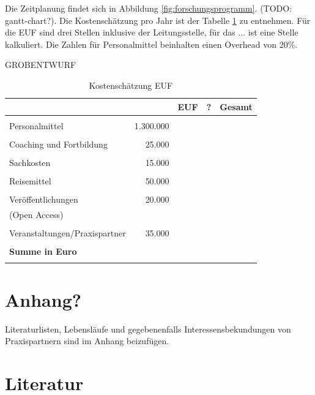 \documentclass[a4paper,11pt,twoside]{scrartcl}
\begin{document}
Die Zeitplanung findet sich in Abbildung \ref{fig:forschungsprogramm}. (TODO: gantt-chart?). Die Kostenschätzung pro Jahr ist der Tabelle \ref{tab:kostenkalkulation} zu entnehmen. Für die EUF sind drei Stellen inklusive der Leitungsstelle, für das ... ist eine Stelle kalkuliert. Die Zahlen für Personalmittel beinhalten einen Overhead von 20\%.

GROBENTWURF
\begin{table}[h]
\begin{center}
  \caption{Kostenschätzung EUF}
\begin{tabular}[h]{lrrrr}
&& EUF & ? & Gesamt\\
\hline
\hline
&&&&\\
 Personalmittel & 1.300.000 & & &\\
 \hline
 &&&&\\
 Coaching und Fortbildung & 25.000& & &\\
 \hline
 &&&&\\
 Sachkosten & 15.000& & &\\
 \hline
 &&&&\\
 Reisemittel & 50.000 & & &\\
 \hline
 &&&&\\
 Veröffentlichungen & 20.000 &&&\\
 (Open Access) && & &\\
 \hline
 &&&&\\
Veranstaltungen/Praxispartner & 35.000& &&\\
 \hline
 \hline
 &&&&\\
 \textbf{Summe in Euro}&& \textbf{}&\textbf{}&\underline{\textbf{}}\\
 \label{tab:kostenkalkulation}
\end{tabular}
\end{center}
\end{table}

\clearpage

\appendix
\section{Anhang?}

Literaturlisten, Lebensläufe und gegebenenfalls Interessensbekundungen von Praxispartnern sind im Anhang beizufügen.

\clearpage
\section{Literatur} \label{sec:lit}

\end{document}
